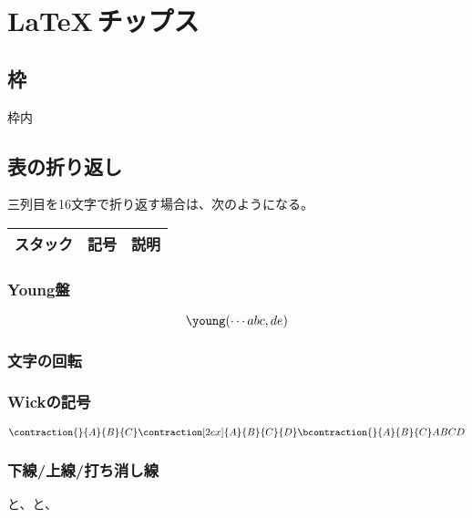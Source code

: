 \section{\LaTeX\,チップス}\label{s1:LaTexチップス} %
\subsection{枠}\label{s2:枠} %
	\begin{center}\begin{boxedminipage}{.9\textwidth}
	枠内
	\end{boxedminipage}\end{center}
\subsection{表の折り返し}\label{s2:表の折り返し} %
	三列目を16文字で折り返す場合は、次のようになる。
	\begin{table}[htbp] %
		\begin{center}\begin{tabular}{ccp{}} \hline
			スタック & 記号 & 説明 \\ \hline
		\end{tabular}\end{center}
	\end{table} %
\subsubsection{Young盤}\label{s2:Young盤} %
	$$
	\young(\cdots abc, de)
	$$
\subsubsection{文字の回転}\label{s2:文字の回転} %
\subsubsection{Wickの記号}\label{s2:Wickの記号} %
	$$
	\contraction{}{A}{B}{C}
	\contraction[2ex]{A}{B}{C}{D}
	\bcontraction{}{A}{B}{C}
	ABCD
	$$
\subsubsection{下線/上線/打ち消し線}\label{s2:下線/上線/打ち消し線} %
	と、と、
